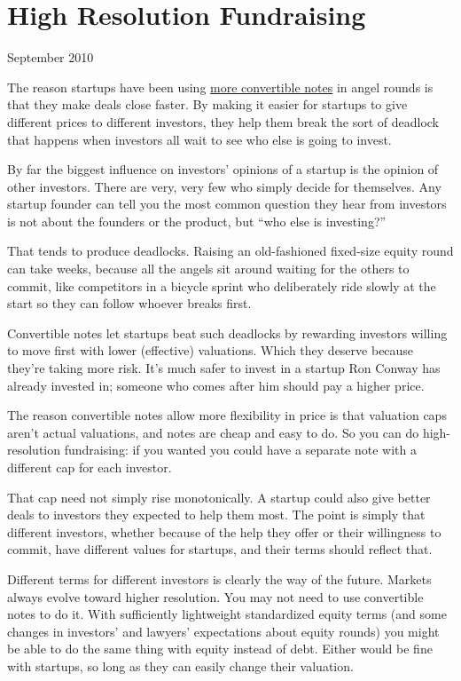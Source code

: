 \chapter{High Resolution Fundraising }

September 2010

The reason startups have been using
\href{http://twitter.com/paulg/status/22319113993}{more convertible
notes} in angel rounds is that they make deals close faster. By making
it easier for startups to give different prices to different investors,
they help them break the sort of deadlock that happens when investors
all wait to see who else is going to invest.

By far the biggest influence on investors' opinions of a startup is the
opinion of other investors. There are very, very few who simply decide
for themselves. Any startup founder can tell you the most common
question they hear from investors is not about the founders or the
product, but ``who else is investing?''

That tends to produce deadlocks. Raising an old-fashioned fixed-size
equity round can take weeks, because all the angels sit around waiting
for the others to commit, like competitors in a bicycle sprint who
deliberately ride slowly at the start so they can follow whoever breaks
first.

Convertible notes let startups beat such deadlocks by rewarding
investors willing to move first with lower (effective) valuations. Which
they deserve because they're taking more risk. It's much safer to invest
in a startup Ron Conway has already invested in; someone who comes after
him should pay a higher price.

The reason convertible notes allow more flexibility in price is that
valuation caps aren't actual valuations, and notes are cheap and easy to
do. So you can do high-resolution fundraising: if you wanted you could
have a separate note with a different cap for each investor.

That cap need not simply rise monotonically. A startup could also give
better deals to investors they expected to help them most. The point is
simply that different investors, whether because of the help they offer
or their willingness to commit, have different values for startups, and
their terms should reflect that.

Different terms for different investors is clearly the way of the
future. Markets always evolve toward higher resolution. You may not need
to use convertible notes to do it. With sufficiently lightweight
standardized equity terms (and some changes in investors' and lawyers'
expectations about equity rounds) you might be able to do the same thing
with equity instead of debt. Either would be fine with startups, so long
as they can easily change their valuation.

